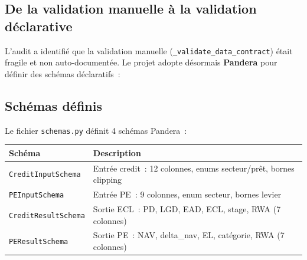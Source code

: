 \documentclass[12pt,a4paper]{article}
\begin{document}
\subsection{De la validation manuelle \`a la validation d\'eclarative}

L'audit a identifi\'e que la validation manuelle (\texttt{\_validate\_data\_contract}) \'etait fragile et non auto-document\'ee. Le projet adopte d\'esormais \textbf{Pandera} pour d\'efinir des sch\'emas d\'eclaratifs~:

\begin{center}
\end{center}

\subsection{Sch\'emas d\'efinis}

Le fichier \texttt{schemas.py} d\'efinit 4 sch\'emas Pandera~:

\begin{center}
\begin{tabular}{lp{7cm}}
\toprule
\textbf{Sch\'ema} & \textbf{Description} \\
\midrule
\texttt{CreditInputSchema} & Entr\'ee credit~: 12 colonnes, enums secteur/pr\^et, bornes clipping \\
\texttt{PEInputSchema} & Entr\'ee PE~: 9 colonnes, enum secteur, bornes levier \\
\texttt{CreditResultSchema} & Sortie ECL~: PD, LGD, EAD, ECL, stage, RWA (7 colonnes) \\
\texttt{PEResultSchema} & Sortie PE~: NAV, delta\_nav, EL, cat\'egorie, RWA (7 colonnes) \\
\bottomrule
\end{tabular}
\end{center}
\end{document}
